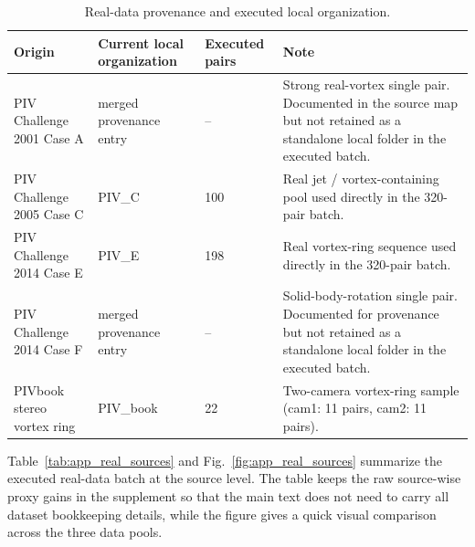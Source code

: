 \documentclass[lettersize,journal,onecolumn]{IEEEtran}
\begin{document}
\begin{table}[!t]
  \centering
  \caption{Real-data provenance and executed local organization.}
  \label{tab:app_sources}
  \small
  \renewcommand{\arraystretch}{1.12}
  \setlength{\tabcolsep}{4pt}
  \begin{tabular}{@{}p{3.2cm}p{3.2cm}p{1.4cm}p{6.6cm}@{}}
    \toprule
    Origin & Current local organization & Executed pairs & Note \\
    \midrule
    PIV Challenge 2001 Case A & merged provenance entry & -- & Strong real-vortex single pair. Documented in the source map but not retained as a standalone local folder in the executed batch. \\
    PIV Challenge 2005 Case C & PIV\_C & 100 & Real jet / vortex-containing pool used directly in the 320-pair batch. \\
    PIV Challenge 2014 Case E & PIV\_E & 198 & Real vortex-ring sequence used directly in the 320-pair batch. \\
    PIV Challenge 2014 Case F & merged provenance entry & -- & Solid-body-rotation single pair. Documented for provenance but not retained as a standalone local folder in the executed batch. \\
    PIVbook stereo vortex ring & PIV\_book & 22 & Two-camera vortex-ring sample (cam1: 11 pairs, cam2: 11 pairs). \\
    \bottomrule
  \end{tabular}
\end{table}

Table~\ref{tab:app_real_sources} and Fig.~\ref{fig:app_real_sources}
summarize the executed real-data batch at the source level.
The table keeps the raw source-wise proxy gains in the supplement so that the main text
does not need to carry all dataset bookkeeping details, while the figure gives a quick
visual comparison across the three data pools.

\begin{table}[!t]
  \centering
  \caption{Source-wise summary of the executed 320-pair real-data batch.
  Positive $\Delta \mathrm{Corr}_g$ reports the percentage of pairs with improved structural agreement;
  $\Delta \mathrm{RMSE}_g$ is positive for every executed pair in all three pools.}
  \label{tab:app_real_sources}
  \small
  \renewcommand{\arraystretch}{1.12}
  \setlength{\tabcolsep}{4pt}
\end{table}
\end{document}
